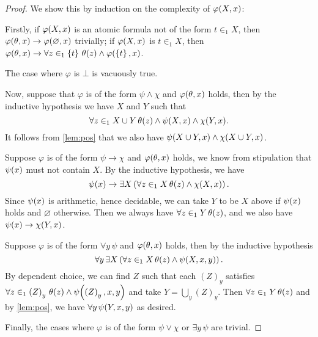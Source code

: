 \documentclass[11pt]{article}
\theoremstyle{plain}
\theoremstyle{definition}
\begin{document}
\begin{proof}
    We show this by induction on the complexity of $\varphi\mleft(X, x\mright)$:

    Firstly, if $\varphi\mleft(X, x\mright)$ is an atomic formula not of the form $t \in_1 X$, then $\varphi\mleft(\theta, x\mright) \rightarrow \varphi\mleft(\varnothing, x\mright)$ trivially; if $\varphi\mleft(X, x\mright)$ is $t \in_1 X$, then $\varphi\mleft(\theta, x\mright) \rightarrow \forall z \in_1 \left\{t\right\} \, \theta\mleft(z\mright) \land \varphi\mleft(\left\{t\right\}, x\mright)$.

    The case where $\varphi$ is $\bot$ is vacuously true.

    Now, suppose that $\varphi$ is of the form $\psi \land \chi$ and $\varphi\mleft(\theta, x\mright)$ holds, then by the inductive hypothesis we have $X$ and $Y$ such that
    \[\forall z \in_1 X \cup Y \, \theta\mleft(z\mright) \land \psi\mleft(X, x\mright) \land \chi\mleft(Y, x\mright).\]
    It follows from \autoref{lem:pos} that we also have $\psi\mleft(X \cup Y, x\mright) \land \chi\mleft(X \cup Y, x\mright)$.

    Suppose $\varphi$ is of the form $\psi \rightarrow \chi$ and $\varphi\mleft(\theta, x\mright)$ holds, we know from stipulation that $\psi\mleft(x\mright)$ must not contain $X$. By the inductive hypothesis, we have
    \[\psi\mleft(x\mright) \rightarrow \exists X \left(\forall z \in_1 X \, \theta\mleft(z\mright) \land \chi\mleft(X, x\mright)\right).\] Since $\psi\mleft(x\mright)$ is arithmetic, hence decidable, we can take $Y$ to be $X$ above if $\psi\mleft(x\mright)$ holds and $\varnothing$ otherwise. Then we always have $\forall z \in_1 Y \, \theta\mleft(z\mright)$, and we also have $\psi\mleft(x\mright) \rightarrow \chi\mleft(Y, x\mright)$.

    Suppose $\varphi$ is of the form $\forall y \, \psi$ and $\varphi\mleft(\theta, x\mright)$ holds, then by the inductive hypothesis
    \[\forall y \, \exists X \left(\forall z \in_1 X \, \theta\mleft(z\mright) \land \psi\mleft(X, x, y\mright)\right).\]
    By dependent choice, we can find $Z$ such that each $\left(Z\right)_y$ satisfies $\forall z \in_1 \left(Z\right)_y \, \theta\mleft(z\mright) \land \psi\mleft(\left(Z\right)_y, x, y\mright)$ and take $Y = \bigcup_y \left(Z\right)_y$. Then $\forall z \in_1 Y \, \theta\mleft(z\mright)$ and by \autoref{lem:pos}, we have $\forall y \, \psi\mleft(Y, x, y\mright)$ as desired.

    Finally, the cases where $\varphi$ is of the form $\psi \lor \chi$ or $\exists y \, \psi$ are trivial.
\end{proof}
\end{document}
